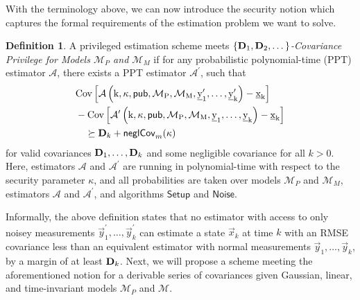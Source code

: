 \documentclass[conference]{IEEEtran}
\theoremstyle{definition}
\newtheorem{definition}{Definition}[section]
\theoremstyle{definition}
\theoremstyle{remark}
\begin{document}
With the terminology above, we can now introduce the security notion which captures the formal requirements of the estimation problem we want to solve.
\begin{definition}\label{def:cov_privilege_security_notion}
   A privileged estimation scheme meets \textit{$\{{{\mathbf{D}}}_1,{{\mathbf{D}}}_2,\dots\}$-Covariance Privilege for Models $\mathcal{M}_P$ and $\mathcal{M}_M$} if for any probabilistic polynomial-time (PPT) estimator $\mathcal{A}$, there exists a PPT estimator $\mathcal{A}^\prime$, such that
   \begin{equation}
      \begin{split}
         &\operatorfont{Cov}\left[\mathcal{A}\left(k, \kappa, \mathsf{pub}, \mathcal{M}_P, \mathcal{M}_M, \vec{y}^\prime_1,\dots,\vec{y}^\prime_k\right) - \vec{x}_k \right]\\
         &-\operatorfont{Cov}\left[\mathcal{A}^\prime\left(k, \kappa, \mathsf{pub}, \mathcal{M}_P, \mathcal{M}_M, \vec{y}_1,\dots,\vec{y}_k\right) - \vec{x}_k \right]\\
         &\quad\succeq \mat{D}_k + \mathsf{neglCov}_m(\kappa)
      \end{split}
   \end{equation}
   for valid covariances ${{\mathbf{D}}}_1,\dots,{{\mathbf{D}}}_k$ and some negligible covariance for all $k>0$. Here, estimators $\mathcal{A}$ and $\mathcal{A}^\prime$ are running in polynomial-time with respect to the security parameter $\kappa$, and all probabilities are taken over models $\mathcal{M}_P$ and $\mathcal{M}_M$, estimators $\mathcal{A}$ and $\mathcal{A}^\prime$, and algorithms $\mathsf{Setup}$ and $\mathsf{Noise}$.
\end{definition}

Informally, the above definition states that no estimator with access to only noisey measurements $\vec{y}^\prime_1,\dots,\vec{y}^\prime_k$ can estimate a state $\vec{x}_k$ at time $k$ with an RMSE covariance less than an equivalent estimator with normal measurements $\vec{y}_1,\dots,\vec{y}_k$, by a margin of at least ${{\mathbf{D}}}_k$. Next, we will propose a scheme meeting the aforementioned notion for a derivable series of covariances given Gaussian, linear, and time-invariant models $\mathcal{M}_P$ and $\mathcal{M}$.

% 
%                                                                                
%                                                                                
%                                                                                
% 
\end{document}
